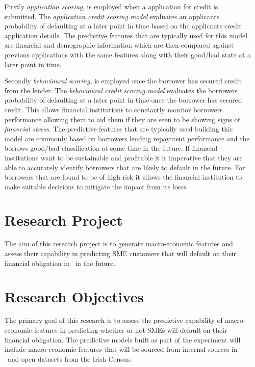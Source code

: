Firstly \textit{application scoring}, is employed when a application for credit is submitted. The \textit{application credit scoring model} evaluates an applicants probability of defaulting at a later point in time based on the applicants credit application details. The predictive features that are typically used for this model are financial and demographic information which are then compared against previous applications with the same features along with their good/bad state at a later point in time.

Secondly \textit{behavioural scoring}, is employed once the borrower has secured credit from the lender. The \textit{behavioural credit scoring model} evaluates the borrowers probability of defaulting at a later point in time once the borrower has secured credit. This allows financial institutions to constantly monitor borrowers performance allowing them to aid them if they are seen to be showing signs of \textit{financial stress}. The predictive features that are typically used building this model are commonly based on borrowers lending repayment performance and the borrows good/bad classification at some time in the future. If financial institutions want to be sustainable and profitable it is imperative that they are able to accurately identify borrowers that are likely to default in the future. For borrowers that are found to be of high risk it allows the financial institution to make suitable decisions to mitigate the impact from its loses.


\section{Research Project}

The aim of this research project is to generate macro-economic features and assess their capability in predicting SME customers that will default on  their financial obligation in \subjectname\ in the future.


\section{Research Objectives}
The primary goal of this research is to assess the predictive capability of macro-economic features in predicting whether or not SMEs will default on their financial obligation. The predictive models built as part of the experiment will include macro-economic features that will be sourced from internal sources in \subjectname\ and open datasets from the Irish Census.


